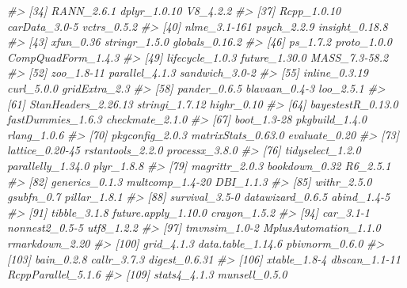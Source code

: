 \documentclass[
  man,floatsintext]{apa6}
\newenvironment{Shaded}{\begin{snugshade}}{\end{snugshade}}
\newcommand{\CommentTok}[1]{\textcolor[rgb]{0.56,0.35,0.01}{\textit{#1}}}
\begin{document}
\begin{Shaded}
\begin{Highlighting}[]
\CommentTok{\#\textgreater{}  [34] RANN\_2.6.1            dplyr\_1.0.10          V8\_4.2.2             }
\CommentTok{\#\textgreater{}  [37] Rcpp\_1.0.10           carData\_3.0{-}5         vctrs\_0.5.2          }
\CommentTok{\#\textgreater{}  [40] nlme\_3.1{-}161          psych\_2.2.9           insight\_0.18.8       }
\CommentTok{\#\textgreater{}  [43] xfun\_0.36             stringr\_1.5.0         globals\_0.16.2       }
\CommentTok{\#\textgreater{}  [46] ps\_1.7.2              proto\_1.0.0           CompQuadForm\_1.4.3   }
\CommentTok{\#\textgreater{}  [49] lifecycle\_1.0.3       future\_1.30.0         MASS\_7.3{-}58.2        }
\CommentTok{\#\textgreater{}  [52] zoo\_1.8{-}11            parallel\_4.1.3        sandwich\_3.0{-}2       }
\CommentTok{\#\textgreater{}  [55] inline\_0.3.19         curl\_5.0.0            gridExtra\_2.3        }
\CommentTok{\#\textgreater{}  [58] pander\_0.6.5          blavaan\_0.4{-}3         loo\_2.5.1            }
\CommentTok{\#\textgreater{}  [61] StanHeaders\_2.26.13   stringi\_1.7.12        highr\_0.10           }
\CommentTok{\#\textgreater{}  [64] bayestestR\_0.13.0     fastDummies\_1.6.3     checkmate\_2.1.0      }
\CommentTok{\#\textgreater{}  [67] boot\_1.3{-}28           pkgbuild\_1.4.0        rlang\_1.0.6          }
\CommentTok{\#\textgreater{}  [70] pkgconfig\_2.0.3       matrixStats\_0.63.0    evaluate\_0.20        }
\CommentTok{\#\textgreater{}  [73] lattice\_0.20{-}45       rstantools\_2.2.0      processx\_3.8.0       }
\CommentTok{\#\textgreater{}  [76] tidyselect\_1.2.0      parallelly\_1.34.0     plyr\_1.8.8           }
\CommentTok{\#\textgreater{}  [79] magrittr\_2.0.3        bookdown\_0.32         R6\_2.5.1             }
\CommentTok{\#\textgreater{}  [82] generics\_0.1.3        multcomp\_1.4{-}20       DBI\_1.1.3            }
\CommentTok{\#\textgreater{}  [85] withr\_2.5.0           gsubfn\_0.7            pillar\_1.8.1         }
\CommentTok{\#\textgreater{}  [88] survival\_3.5{-}0        datawizard\_0.6.5      abind\_1.4{-}5          }
\CommentTok{\#\textgreater{}  [91] tibble\_3.1.8          future.apply\_1.10.0   crayon\_1.5.2         }
\CommentTok{\#\textgreater{}  [94] car\_3.1{-}1             nonnest2\_0.5{-}5        utf8\_1.2.2           }
\CommentTok{\#\textgreater{}  [97] tmvnsim\_1.0{-}2         MplusAutomation\_1.1.0 rmarkdown\_2.20       }
\CommentTok{\#\textgreater{} [100] grid\_4.1.3            data.table\_1.14.6     pbivnorm\_0.6.0       }
\CommentTok{\#\textgreater{} [103] bain\_0.2.8            callr\_3.7.3           digest\_0.6.31        }
\CommentTok{\#\textgreater{} [106] xtable\_1.8{-}4          dbscan\_1.1{-}11         RcppParallel\_5.1.6   }
\CommentTok{\#\textgreater{} [109] stats4\_4.1.3          munsell\_0.5.0}
\end{Highlighting}
\end{Shaded}
\end{document}
